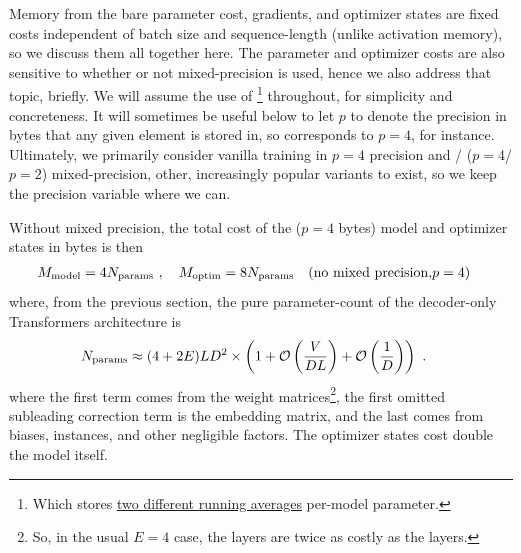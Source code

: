 \documentclass[11pt]{article}
\begin{document}
Memory from the bare parameter cost, gradients, and optimizer states are fixed costs independent of
batch size and sequence-length (unlike activation memory), so we discuss them all together here. The
parameter and optimizer costs are also sensitive to whether or not mixed-precision is used, hence we
also address that topic, briefly.  We will assume the use of \footnote{Which stores
	\href{https://pytorch.org/docs/stable/generated/torch.optim.Adam.html}{two different running
		averages} per-model parameter.} throughout, for simplicity and concreteness. It will sometimes be
useful below to let $ p $ to denote the precision in bytes that any given element is stored in, so
 corresponds to $ p=4 $, for instance. Ultimately, we primarily consider
vanilla training in $ p=4 $ precision and / ($ p=4
$/ $ p=2 $)  mixed-precision, other, increasingly popular variants to exist, so we keep the
precision variable where we can.


Without mixed precision, the total cost of the
 ($ p=4 $ bytes) model and optimizer states in bytes is then
\begin{align}
	M _{ \rm model} & = 4 N _{ \rm params } \ , \quad M_{ \rm  optim } = 8 N _{ \rm params }
	\quad ({\rm no \ mixed \ precision, } p=4)
	\label{eq_optimizer_states_mem_no_mp}
\end{align}
where, from the previous section, the pure parameter-count of the decoder-only Transformers
architecture is
\begin{align}
	N _{ \rm params } & \approx  (4 + 2E) L D ^{ 2 } \times \left ( 1 + \mathcal{O} \left( \frac{ V }{ DL }
		\right) + \mathcal{O} \left( \frac{ 1 }{ D } \right)  \right ) \ . \label{eq_approx_params_no_sharding}
\end{align}
where the first term comes from the  weight matrices\footnote{So,
	in the usual $ E=4 $ case, the  layers are twice as costly as the
	 layers.}, the first omitted subleading correction term is the embedding
matrix, and the last comes from biases,  instances, and other negligible
factors.  The optimizer states cost double the model itself.
\end{document}
